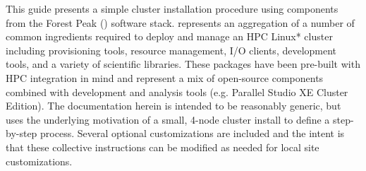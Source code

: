 This guide presents a simple cluster installation procedure using components
from the Forest Peak (\FSP{}) software stack. \FSP{} represents an aggregation
of a number of common ingredients required to deploy and manage an HPC Linux*
cluster including provisioning tools, resource management, I/O clients,
development tools, and a variety of scientific libraries. These packages have
been pre-built with HPC integration in mind and represent a mix of open-source
components combined with \Intel{} development and analysis tools (e.g. \Intel{}
Parallel Studio XE Cluster Edition).
The documentation herein is intended to be reasonably generic, but uses the
underlying motivation of a small, 4-node cluster install to define a step-by-step
process. Several optional customizations are included and the intent is that
these collective instructions can be modified as needed for local site
customizations. 
